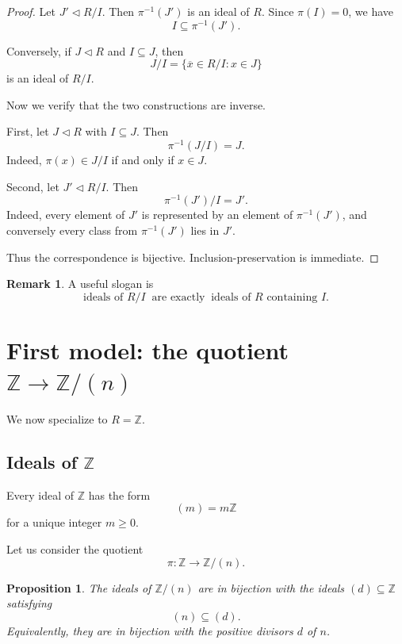 \documentclass[11pt]{article}
\newtheorem{proposition}[theorem]{Proposition}
\theoremstyle{definition}
\newtheorem{remark}[theorem]{Remark}
\newcommand{\Z}{\mathbb{Z}}
\newcommand{\ol}[1]{\overline{#1}}
\begin{document}
	\begin{proof}
		Let \(J'\triangleleft R/I\). Then \(\pi^{-1}(J')\) is an ideal of \(R\). Since \(\pi(I)=0\), we have
		\[
		I\subseteq \pi^{-1}(J').
		\]
		
		Conversely, if \(J\triangleleft R\) and \(I\subseteq J\), then
		\[
		J/I=\{\ol{x}\in R/I:x\in J\}
		\]
		is an ideal of \(R/I\).
		
		Now we verify that the two constructions are inverse.
		
		First, let \(J\triangleleft R\) with \(I\subseteq J\). Then
		\[
		\pi^{-1}(J/I)=J.
		\]
		Indeed, \(\pi(x)\in J/I\) if and only if \(x\in J\).
		
		Second, let \(J'\triangleleft R/I\). Then
		\[
		\pi^{-1}(J')/I=J'.
		\]
		Indeed, every element of \(J'\) is represented by an element of \(\pi^{-1}(J')\), and conversely every class from \(\pi^{-1}(J')\) lies in \(J'\).
		
		Thus the correspondence is bijective. Inclusion-preservation is immediate.
	\end{proof}
	
	\begin{remark}
		A useful slogan is
		\[
		\boxed{
			\text{ideals of }R/I
			\;\;\text{are exactly}\;\;
			\text{ideals of }R\text{ containing }I.
		}
		\]
	\end{remark}
	
	\section{First model: the quotient \(\Z\to \Z/(n)\)}
	
	We now specialize to \(R=\Z\).
	
	\subsection{Ideals of \(\Z\)}
	
	Every ideal of \(\Z\) has the form
	\[
	(m)=m\Z
	\]
	for a unique integer \(m\ge 0\).
	
	Let us consider the quotient
	\[
	\pi:\Z\to \Z/(n).
	\]
	
	\begin{proposition}\label{prop:Z-quotient}
		The ideals of \(\Z/(n)\) are in bijection with the ideals \((d)\subseteq \Z\) satisfying
		\[
		(n)\subseteq (d).
		\]
		Equivalently, they are in bijection with the positive divisors \(d\) of \(n\).
	\end{proposition}
	
\end{document}
